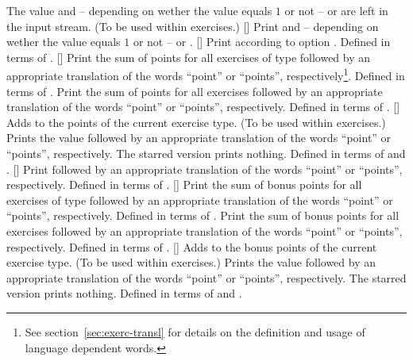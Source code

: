 \documentclass{xsim-manual}
\begin{document}
\begin{commands}
    The value and -- depending on wether the value equals $1$ or not --
     or  are left in the input stream. (To be used
    within exercises.)
  []
    Print  and -- depending on wether the value equals $1$ or not --
     or .
  []
    Print  according to option .  Defined in
    terms of .
  []
    Print the sum of points for all exercises of type  followed by
    an appropriate translation of the words \enquote{point} or
    \enquote{points}, respectively\footnote{See section~\vref{sec:exerc-transl}
      for details on the definition and usage of language dependent words.}.
    Defined in terms of .
    Print the sum of points for all exercises followed by an appropriate
    translation of the words \enquote{point} or \enquote{points},
    respectively.  Defined in terms of .
  [\sarg{}]
    Adds  to the points of the current exercise type. (To be used
    within exercises.)  Prints the value followed by an appropriate
    translation of the words \enquote{point} or \enquote{points},
    respectively.  The starred version prints nothing.  Defined in terms of
     and .
  []
    Print followed by an appropriate translation of the words
    \enquote{point} or \enquote{points}, respectively.  Defined in terms of
    .
  []
    Print the sum of bonus points for all exercises of type 
    followed by an appropriate translation of the words \enquote{point} or
    \enquote{points}, respectively.  Defined in terms of
    .
    Print the sum of bonus points for all exercises followed by an appropriate
    translation of the words \enquote{point} or \enquote{points},
    respectively.  Defined in terms of .
  [\sarg{}]
    Adds  to the bonus points of the current exercise type. (To be
    used within exercises.)  Prints the value followed by an appropriate
    translation of the words \enquote{point} or \enquote{points},
    respectively.  The starred version prints nothing.  Defined in terms of
     and .
\end{commands}
\end{document}

